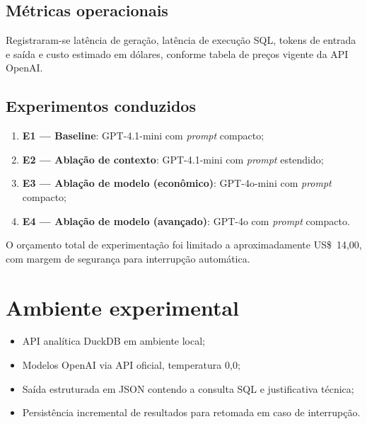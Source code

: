 \subsection{Métricas operacionais}

Registraram-se latência de geração, latência de execução SQL, tokens de entrada e saída e custo estimado em dólares, conforme tabela de preços vigente da API OpenAI.

\subsection{Experimentos conduzidos}

\begin{enumerate}
    \item \textbf{E1 --- Baseline}: GPT-4.1-mini com \textit{prompt} compacto;
    \item \textbf{E2 --- Ablação de contexto}: GPT-4.1-mini com \textit{prompt} estendido;
    \item \textbf{E3 --- Ablação de modelo (econômico)}: GPT-4o-mini com \textit{prompt} compacto;
    \item \textbf{E4 --- Ablação de modelo (avançado)}: GPT-4o com \textit{prompt} compacto.
\end{enumerate}

O orçamento total de experimentação foi limitado a aproximadamente US\$~14,00, com margem de segurança para interrupção automática.

\section{Ambiente experimental}

\begin{itemize}
    \item API analítica DuckDB em ambiente local;
    \item Modelos OpenAI via API oficial, temperatura 0,0;
    \item Saída estruturada em JSON contendo a consulta SQL e justificativa técnica;
    \item Persistência incremental de resultados para retomada em caso de interrupção.
\end{itemize}
